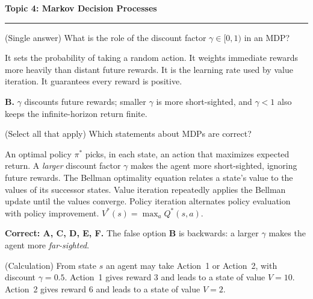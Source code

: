 \documentclass[answers,addpoints]{exam}
\newcommand{\topic}[2]{%
  \vspace{1.0\baselineskip}%
  \noindent\textbf{\large Topic #1: #2}\par
  \noindent\rule{\linewidth}{0.4pt}\par
  \vspace{0.4\baselineskip}}
\begin{document}
\begin{questions}
\topic{4}{Markov Decision Processes}

\question[2] (Single answer) What is the role of the discount factor
$\gamma\in[0,1)$ in an MDP?
\begin{choices}
  \choice It sets the probability of taking a random action.
  \CorrectChoice It weights immediate rewards more heavily than distant future rewards.
  \choice It is the learning rate used by value iteration.
  \choice It guarantees every reward is positive.
\end{choices}
\begin{solution}\textbf{B.} $\gamma$ discounts future rewards; smaller $\gamma$ is
more short-sighted, and $\gamma<1$ also keeps the infinite-horizon return finite.\end{solution}

\question[3] (Select all that apply) Which statements about MDPs are correct?
\begin{checkboxes}
  \CorrectChoice An optimal policy $\pi^{*}$ picks, in each state, an action that
        maximizes expected return.
  \choice A \emph{larger} discount factor $\gamma$ makes the agent more
        short-sighted, ignoring future rewards.
  \CorrectChoice The Bellman optimality equation relates a state's value to the
        values of its successor states.
  \CorrectChoice Value iteration repeatedly applies the Bellman update until the
        values converge.
  \CorrectChoice Policy iteration alternates policy evaluation with policy
        improvement.
  \CorrectChoice $V^{*}(s)=\max_a Q^{*}(s,a)$.
\end{checkboxes}
\begin{solution}
\textbf{Correct: A, C, D, E, F.} The false option \textbf{B} is backwards: a larger
$\gamma$ makes the agent more \emph{far-sighted}.
\end{solution}

\question[5] (Calculation) From state $s$ an agent may take Action~1 or Action~2,
with discount $\gamma=0.5$. Action~1 gives reward $3$ and leads to a state of
value $V=10$. Action~2 gives reward $6$ and leads to a state of value $V=2$.
\end{questions}
\end{document}
